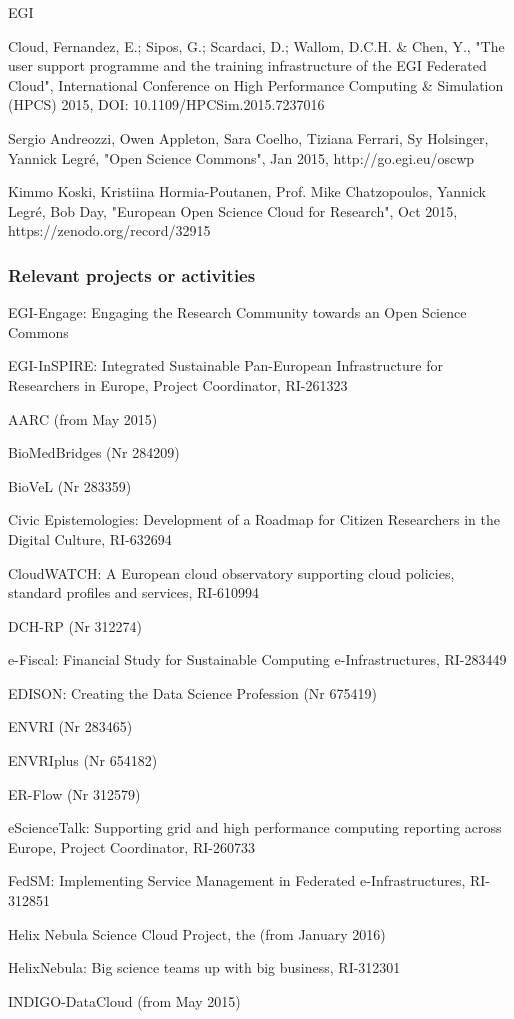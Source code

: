 \begin{sitedescription}{EGI}
\begin{compactenum}
\item Cloud, Fernandez, E.; Sipos, G.; Scardaci, D.; Wallom, D.C.H. \& Chen, Y., "The user support programme and the training infrastructure of the EGI Federated Cloud", International Conference on High Performance Computing \& Simulation (HPCS) 2015, DOI: 10.1109/HPCSim.2015.7237016 
\item Sergio Andreozzi, Owen Appleton, Sara Coelho, Tiziana Ferrari, Sy Holsinger, Yannick Legr\'e, "Open Science Commons", Jan 2015, http://go.egi.eu/oscwp
\item Kimmo Koski, Kristiina Hormia-Poutanen, Prof. Mike Chatzopoulos, Yannick Legré, Bob Day, "European Open Science Cloud for Research", Oct 2015, https://zenodo.org/record/32915
\end{compactenum}

\subsubsection*{Relevant projects or activities}

\begin{compactenum}
\item EGI-Engage: Engaging the Research Community towards an Open Science Commons
\item EGI-InSPIRE: Integrated Sustainable Pan-European Infrastructure for Researchers in Europe, Project Coordinator, RI-261323
\item AARC (from May 2015)
\item BioMedBridges (Nr 284209)
\item BioVeL (Nr 283359)
\item Civic Epistemologies: Development of a Roadmap for Citizen Researchers in the Digital Culture, RI-632694
\item CloudWATCH: A European cloud observatory supporting cloud policies, standard profiles and services, RI-610994
\item DCH-RP (Nr 312274)
\item e-Fiscal: Financial Study for Sustainable Computing e-Infrastructures, RI-283449
\item EDISON: Creating the Data Science Profession (Nr 675419)
\item ENVRI (Nr 283465)
\item ENVRIplus (Nr 654182)
\item ER-Flow (Nr 312579)
\item eScienceTalk: Supporting grid and high performance computing reporting across Europe, Project Coordinator, RI-260733
\item FedSM: Implementing Service Management in Federated e-Infrastructures, RI-312851
\item Helix Nebula Science Cloud Project, the (from January 2016)
\item HelixNebula: Big science teams up with big business, RI-312301
\item INDIGO-DataCloud (from May 2015)
\end{compactenum}


\end{sitedescription}
